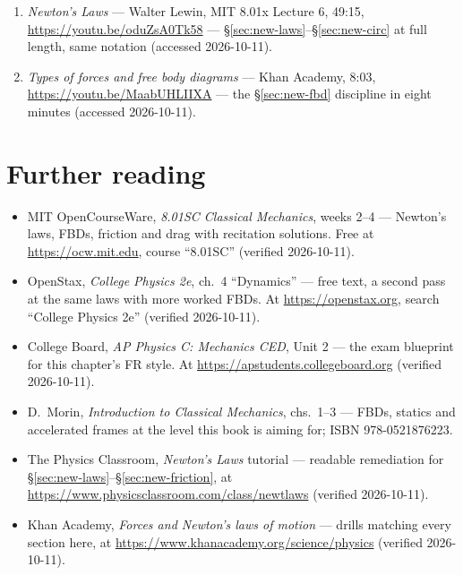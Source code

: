 \begin{rulebox}
\begin{enumerate}
\item \emph{Newton's Laws} --- Walter Lewin, MIT 8.01x Lecture 6, 49:15,
\url{https://youtu.be/oduZsA0Tk58} --- \S\ref{sec:new-laws}--\S\ref{sec:new-circ}
at full length, same notation (accessed 2026-10-11).
\item \emph{Types of forces and free body diagrams} --- Khan Academy, 8:03,
\url{https://youtu.be/MaabUHLIIXA} --- the §\ref{sec:new-fbd} discipline in
eight minutes (accessed 2026-10-11).
\end{enumerate}
\end{rulebox}

\section*{Further reading}

\begin{itemize}
\item MIT OpenCourseWare, \emph{8.01SC Classical Mechanics}, weeks 2--4 ---
Newton's laws, FBDs, friction and drag with recitation solutions. Free at
\url{https://ocw.mit.edu}, course ``8.01SC'' (verified 2026-10-11).
\item OpenStax, \emph{College Physics 2e}, ch.~4 ``Dynamics'' --- free text,
a second pass at the same laws with more worked FBDs. At
\url{https://openstax.org}, search ``College Physics 2e'' (verified 2026-10-11).
\item College Board, \emph{AP Physics C: Mechanics CED}, Unit 2 --- the exam
blueprint for this chapter's FR style. At
\url{https://apstudents.collegeboard.org} (verified 2026-10-11).
\item D.~Morin, \emph{Introduction to Classical Mechanics}, chs.~1--3 ---
FBDs, statics and accelerated frames at the level this book is aiming for;
ISBN 978-0521876223.
\item The Physics Classroom, \emph{Newton's Laws} tutorial --- readable
remediation for \S\ref{sec:new-laws}--\S\ref{sec:new-friction}, at
\url{https://www.physicsclassroom.com/class/newtlaws} (verified 2026-10-11).
\item Khan Academy, \emph{Forces and Newton's laws of motion} --- drills
matching every section here, at
\url{https://www.khanacademy.org/science/physics} (verified 2026-10-11).
\end{itemize}

